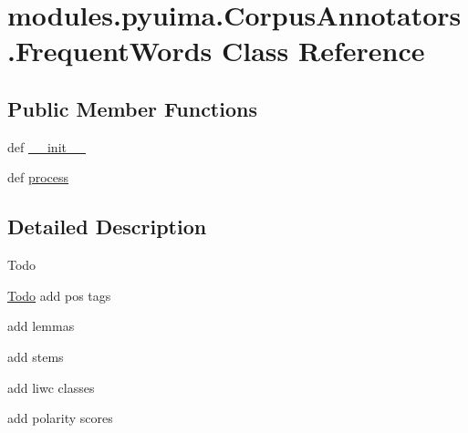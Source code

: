 \hypertarget{classmodules_1_1pyuima_1_1CorpusAnnotators_1_1FrequentWords}{\section{modules.\-pyuima.\-Corpus\-Annotators.\-Frequent\-Words \-Class \-Reference}
\label{classmodules_1_1pyuima_1_1CorpusAnnotators_1_1FrequentWords}
}
\subsection*{\-Public \-Member \-Functions}
\begin{DoxyCompactItemize}
\item 
def \hyperlink{classmodules_1_1pyuima_1_1CorpusAnnotators_1_1FrequentWords_abdb79715505ac7826bc031b2651f30bc}{\-\_\-\-\_\-init\-\_\-\-\_\-}
\item 
def \hyperlink{classmodules_1_1pyuima_1_1CorpusAnnotators_1_1FrequentWords_a532e30607ce10dbd4f807b3fa9096ac7}{process}
\end{DoxyCompactItemize}


\subsection{\-Detailed \-Description}
\begin{DoxyRefDesc}{\-Todo}
\item[\hyperlink{todo__todo000003}{\-Todo}]add pos tags 

add lemmas 

add stems 

add liwc classes 

add polarity scores \end{DoxyRefDesc}


